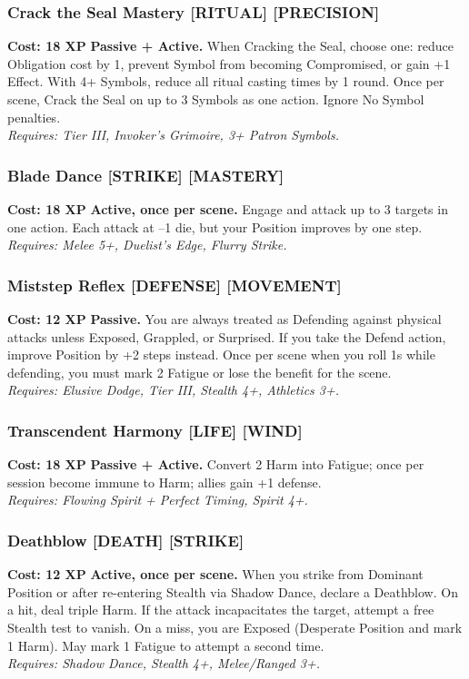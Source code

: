 \subsubsection*{Crack the Seal Mastery \textnormal{[RITUAL] [PRECISION]}}
\label{talent:crack-seal-mastery}
\textbf{Cost: 18 XP} \textbf{Passive + Active.} When Cracking the Seal, choose one: reduce Obligation cost by 1, prevent Symbol from becoming Compromised, or gain +1 Effect. With 4+ Symbols, reduce all ritual casting times by 1 round. Once per scene, Crack the Seal on up to 3 Symbols as one action. Ignore No Symbol penalties. \\
\textit{Requires: Tier III, Invoker’s Grimoire, 3+ Patron Symbols.}

\subsubsection*{Blade Dance \textnormal{[STRIKE] [MASTERY]}}
\label{talent:blade-dance}
\textbf{Cost: 18 XP} \textbf{Active, once per scene.} Engage and attack up to 3 targets in one action. Each attack at –1 die, but your Position improves by one step. \\
\textit{Requires: Melee 5+, Duelist’s Edge, Flurry Strike.}

\subsubsection*{Miststep Reflex \textnormal{[DEFENSE] [MOVEMENT]}}
\label{talent:miststep-reflex}
\textbf{Cost: 12 XP} \textbf{Passive.} You are always treated as Defending against physical attacks unless Exposed, Grappled, or Surprised. If you take the Defend action, improve Position by +2 steps instead. Once per scene when you roll 1s while defending, you must mark 2 Fatigue or lose the benefit for the scene. \\
\textit{Requires: Elusive Dodge, Tier III, Stealth 4+, Athletics 3+.}

\subsubsection*{Transcendent Harmony \textnormal{[LIFE] [WIND]}}
\label{talent:transcendent-harmony}
\textbf{Cost: 18 XP} \textbf{Passive + Active.} Convert 2 Harm into Fatigue; once per session become immune to Harm; allies gain +1 defense. \\
\textit{Requires: Flowing Spirit + Perfect Timing, Spirit 4+.}

\subsubsection*{Deathblow \textnormal{[DEATH] [STRIKE]}}
\label{talent:deathblow}
\textbf{Cost: 12 XP} \textbf{Active, once per scene.} When you strike from Dominant Position or after re-entering Stealth via Shadow Dance, declare a Deathblow. On a hit, deal triple Harm. If the attack incapacitates the target, attempt a free Stealth test to vanish. On a miss, you are Exposed (Desperate Position and mark 1 Harm). May mark 1 Fatigue to attempt a second time. \\
\textit{Requires: Shadow Dance, Stealth 4+, Melee/Ranged 3+.}

